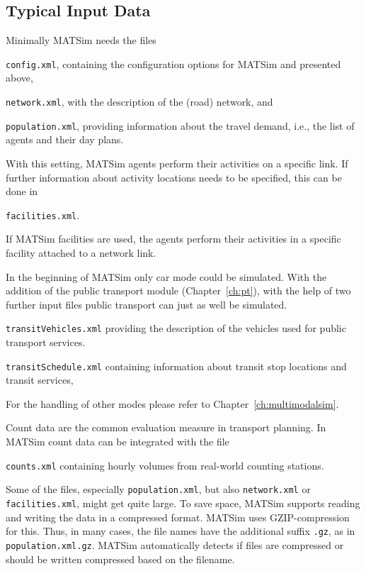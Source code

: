 \subsection{Typical Input Data}
\label{sec:inputdata}
Minimally MATSim needs the files
\begin{compactitem}
	\item \lstinline|config.xml|, containing the configuration options for MATSim and presented above,
	\item \lstinline|network.xml|, with the description of the (road) network, and
	\item \lstinline|population.xml|, providing information about	the travel demand, i.e., the list of agents and their day plans.
\end{compactitem}
%
With this setting, MATSim agents perform their activities on a specific link. If further information about activity locations needs to be specified, this can be done in 
\begin{compactitem}
\item \lstinline|facilities.xml|. 
\end{compactitem}
%
If MATSim facilities are used, the agents perform their activities in a specific facility attached to a network link.

In the beginning of MATSim only car mode could be simulated. With the addition of the public transport module (Chapter~\ref{ch:pt}), with the help of two further input files public transport can just as well be simulated. 

\begin{compactitem}
\item \lstinline|transitVehicles.xml| providing the description of the vehicles used for public transport services. 
\item \lstinline|transitSchedule.xml| containing information about transit stop locations and transit services,
\end{compactitem}
%
For the handling of other modes please refer to Chapter~\ref{ch:multimodalsim}.

Count data are the common evaluation measure in transport planning. In MATSim count data can be integrated with the file
\begin{compactitem}
\item \lstinline|counts.xml| containing hourly volumes from real-world counting stations.
\end{compactitem}

Some of the files, especially \lstinline|population.xml|, but also \lstinline|network.xml| or \lstinline|facilities.xml|, might get quite large. To save space, MATSim supports reading and writing the data in a compressed format. MATSim uses GZIP-compression for this. Thus, in many cases, the file names have the additional suffix \lstinline|.gz|, as in \lstinline|population.xml.gz|. MATSim automatically detects if files are compressed or should be written compressed based on the filename. 

